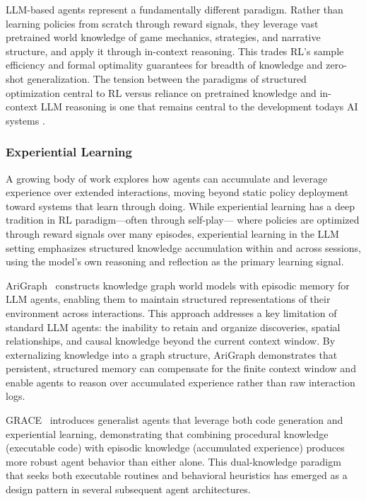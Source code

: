 LLM-based agents represent a fundamentally different paradigm. Rather than learning policies from scratch through reward signals, they leverage vast pretrained world knowledge of game mechanics, strategies, and narrative structure, and apply it through in-context reasoning. This trades RL's sample efficiency and formal optimality guarantees for breadth of knowledge and zero-shot generalization. The tension between the paradigms of structured optimization central to RL versus reliance on pretrained knowledge and in-context LLM reasoning is one that remains central to the development todays AI systems .

\subsubsection{Experiential Learning}\label{sec:experiential_learning}

A growing body of work explores how agents can accumulate and leverage experience over extended interactions, moving beyond static policy deployment toward systems that learn through doing. While experiential learning has a deep tradition in RL paradigm---often through self-play--- where policies are optimized through reward signals over many episodes, experiential learning in the LLM setting emphasizes structured knowledge accumulation within and across sessions, using the model's own reasoning and reflection as the primary learning signal.

AriGraph~\citep{anokhin2024arigraph} constructs knowledge graph world models with episodic memory for LLM agents, enabling them to maintain structured representations of their environment across interactions. This approach addresses a key limitation of standard LLM agents: the inability to retain and organize discoveries, spatial relationships, and causal knowledge beyond the current context window. By externalizing knowledge into a graph structure, AriGraph demonstrates that persistent, structured memory can compensate for the finite context window and enable agents to reason over accumulated experience rather than raw interaction logs.

GRACE~\citep{song2024grace} introduces generalist agents that leverage both code generation and experiential learning, demonstrating that combining procedural knowledge (executable code) with episodic knowledge (accumulated experience) produces more robust agent behavior than either alone. This dual-knowledge paradigm that seeks both executable routines and behavioral heuristics has emerged as a design pattern in several subsequent agent architectures. 

